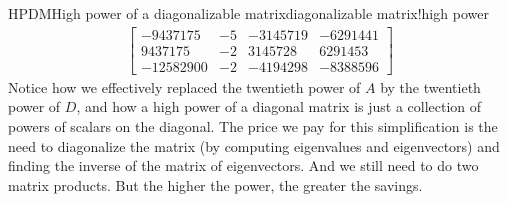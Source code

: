 \begin{example}{HPDM}{High power of a diagonalizable matrix}{diagonalizable matrix!high power}
\begin{align*}
\begin{bmatrix}
 -9437175 & -5 & -3145719 & -6291441 \\
 9437175 & -2 & 3145728 &  6291453 \\
 -12582900 & -2 & -4194298 & -8388596
\end{bmatrix}
%
\end{align*}
%
Notice how we effectively replaced the twentieth power of $A$ by the twentieth power of $D$, and how a high power of a diagonal matrix is just a collection of powers of scalars on the diagonal.  The price we pay for this simplification is the need to diagonalize the matrix (by computing eigenvalues and eigenvectors) and finding the inverse of the matrix of eigenvectors.  And we still need to do two matrix products.  But the higher the power, the greater the savings.
%
\end{example}
%
%
